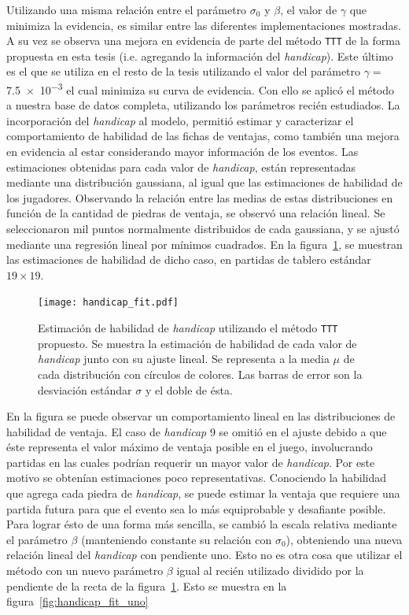 \documentclass[11pt,twoside,spanish]{report} %
\begin{document}
Utilizando una misma relaci\'on entre el par\'ametro $\sigma_0$ y $\beta$, el valor de $\gamma$ que minimiza la evidencia, es similar entre las diferentes implementaciones mostradas.
A su vez se observa una mejora en evidencia de parte del m\'etodo \texttt{TTT} de la forma propuesta en esta tesis (i.e. agregando la informaci\'on del \textit{handicap}).
Este \'ultimo es el que se utiliza en el resto de la tesis utilizando el valor del par\'ametro $\gamma= $\num{7.5e-3}  el cual minimiza su curva de evidencia.
Con ello se aplic\'o el m\'etodo a nuestra base de datos completa,  utilizando los par\'ametros reci\'en estudiados. 
La incorporaci\'on del \textit{handicap} al modelo, permiti\'o estimar y caracterizar el comportamiento de habilidad de las fichas de ventajas, como tambi\'en una mejora en evidencia al estar considerando mayor informaci\'on de los eventos.
Las estimaciones obtenidas para cada valor de \textit{handicap}, est\'an representadas mediante una distribuci\'on gaussiana, al igual que las estimaciones de habilidad de los jugadores.
Observando la relaci\'on entre las medias de estas distribuciones en funci\'on de la cantidad de piedras de ventaja, se observ\'o una relaci\'on lineal.
Se seleccionaron mil puntos normalmente distribuidos de cada gaussiana, y se ajust\'o mediante una regresi\'on lineal por m\'inimos cuadrados.
En la figura~\ref{fig:handicapFIT}, se muestran las estimaciones de habilidad de dicho caso, en partidas de tablero est\'andar $19\times 19$.


\begin{figure}[H]
	\centering
	\texttt{[image: handicap\_fit.pdf]}
	\caption{Estimaci\'on de habilidad de \textit{handicap} utilizando el m\'etodo \texttt{TTT} propuesto. Se muestra la estimaci\'on de habilidad de cada valor de \textit{handicap} junto con su ajuste lineal. Se representa a la media $\mu$ de cada distribuci\'on con c\'irculos de colores.  Las barras de error son la desviaci\'on est\'andar $\sigma$ y el doble de \'esta. }
	\label{fig:handicapFIT}
\end{figure}


En la figura se puede observar un comportamiento lineal en las distribuciones de habilidad de ventaja.
El caso de \textit{handicap} 9 se omiti\'o en el ajuste debido a que \'este representa el valor m\'aximo de ventaja posible en el juego, involucrando partidas en las cuales podr\'ian requerir un mayor valor de \textit{handicap}.
Por este motivo se obten\'ian estimaciones poco representativas.
Conociendo la habilidad que agrega cada piedra de \textit{handicap}, se puede estimar la ventaja que requiere una partida futura para que el evento sea lo m\'as equiprobable y desafiante posible.
Para lograr \'esto de una forma m\'as sencilla, se cambi\'o la escala relativa mediante el par\'ametro $\beta$ (manteniendo constante su relaci\'on con $\sigma_0$), obteniendo una nueva relaci\'on lineal del \textit{handicap} con pendiente uno.
Esto no es otra cosa que utilizar el m\'etodo con un nuevo par\'ametro $\beta$ igual al reci\'en utilizado dividido por la pendiente de la recta de la figura~\ref{fig:handicapFIT}.
Esto se muestra en la figura~\ref{fig:handicap_fit_uno}
\end{document}
